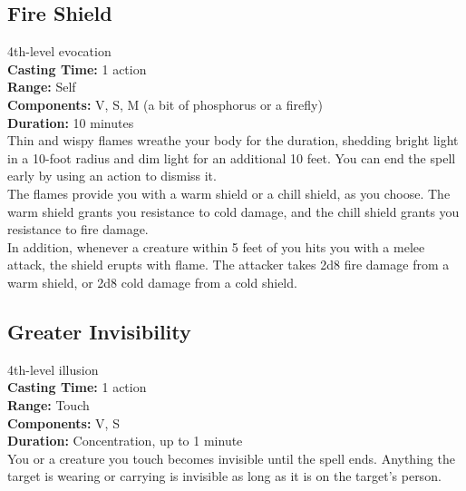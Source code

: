\documentclass[11pt, A4paper, english]{article}
\begin{document}
		\subsection{Fire Shield}
4th-level evocation \\
\textbf{Casting Time:} 1 action \\
\textbf{Range:} Self \\
\textbf{Components:} V, S, M (a bit of phosphorus or a firefly) \\
\textbf{Duration:} 10 minutes \\
Thin and wispy flames wreathe your body for the duration, shedding bright light in a 10-foot radius and dim light for an additional 10 feet. You can end the spell early by using an action to dismiss it. \\
The flames provide you with a warm shield or a chill shield, as you choose. The warm shield grants you resistance to cold damage, and the chill shield grants you resistance to fire damage. \\
In addition, whenever a creature within 5 feet of you hits you with a melee attack, the shield erupts with flame. The attacker takes 2d8 fire damage from a warm shield, or 2d8 cold damage from a cold shield.

		\subsection{Greater Invisibility}
4th-level illusion \\
\textbf{Casting Time:} 1 action \\
\textbf{Range:} Touch \\
\textbf{Components:} V, S \\
\textbf{Duration:} Concentration, up to 1 minute \\
You or a creature you touch becomes invisible until the spell ends. Anything the target is wearing or carrying is invisible as long as it is on the target's person.
\end{document}
